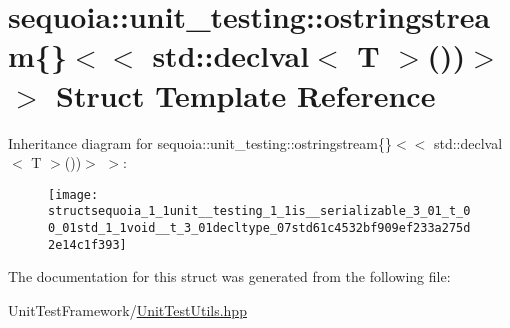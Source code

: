 \hypertarget{structsequoia_1_1unit__testing_1_1is__serializable_3_01_t_00_01std_1_1void__t_3_01decltype_07std61c4532bf909ef233a275d2e14c1f393}{}\section{sequoia\+::unit\+\_\+testing\+::ostringstream\{\}$<$$<$ std\+::declval$<$ T $>$())$>$ $>$ Struct Template Reference}
\label{structsequoia_1_1unit__testing_1_1is__serializable_3_01_t_00_01std_1_1void__t_3_01decltype_07std61c4532bf909ef233a275d2e14c1f393}
Inheritance diagram for sequoia\+::unit\+\_\+testing\+::ostringstream\{\}$<$$<$ std\+::declval$<$ T $>$())$>$ $>$\+:\begin{figure}[H]
\begin{center}
\leavevmode
\texttt{[image: structsequoia\_1\_1unit\_\_testing\_1\_1is\_\_serializable\_3\_01\_t\_00\_01std\_1\_1void\_\_t\_3\_01decltype\_07std61c4532bf909ef233a275d2e14c1f393]}
\end{center}
\end{figure}


The documentation for this struct was generated from the following file\+:\begin{DoxyCompactItemize}
\item 
Unit\+Test\+Framework/\mbox{\hyperlink{_unit_test_utils_8hpp}{Unit\+Test\+Utils.\+hpp}}\end{DoxyCompactItemize}
